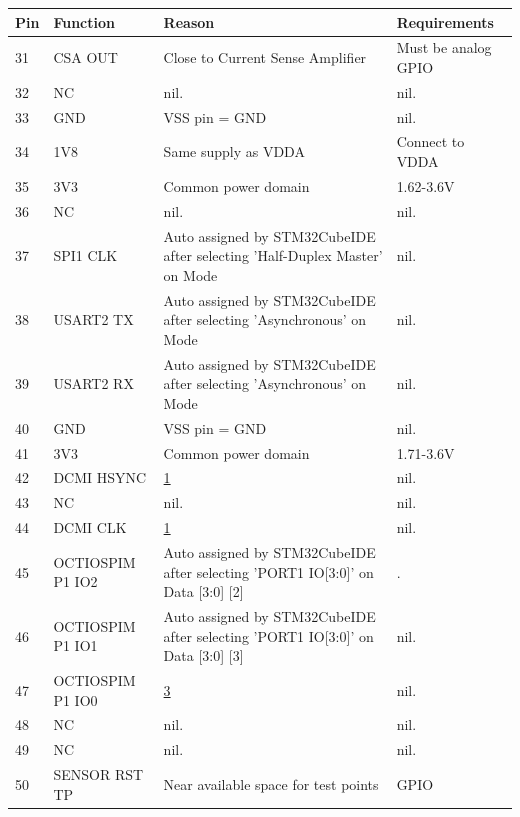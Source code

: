 \begin{table}[H]
    \ContinuedFloat
    \centering
    \begin{tabular}{|l|p{3cm}|p{6.5cm}|p{3.5cm}|}
        \hline
        \textbf{Pin} & \textbf{Function} & \textbf{Reason} & \textbf{Requirements} \\
        \hline
        31 & CSA OUT & Close to Current Sense Amplifier & Must be analog GPIO \\ \hline
        32 & NC & nil. & nil. \\ \hline
        33 & GND & VSS pin = GND & nil. \\ \hline
        34 & 1V8 & Same supply as VDDA & Connect to VDDA \\ \hline
        35 & 3V3 & Common power domain & 1.62-3.6V \\ \hline
        36 & NC & nil. & nil. \\ \hline
        37 & SPI1 CLK & Auto assigned by STM32CubeIDE after selecting 'Half-Duplex Master' on Mode & nil. \\ \hline
        38 & USART2 TX & Auto assigned by STM32CubeIDE after selecting 'Asynchronous' on Mode & nil. \\ \hline
        39 & USART2 RX & Auto assigned by STM32CubeIDE after selecting 'Asynchronous' on Mode & nil. \\ \hline
        40 & GND & VSS pin = GND & nil. \\ \hline
        41 & 3V3 & Common power domain & 1.71-3.6V \\ \hline
        42 & DCMI HSYNC & \hyperlink{dcmi-reason}{1} & nil. \\ \hline
        43 & NC & nil. & nil. \\ \hline
        44 & DCMI CLK & \hyperlink{dcmi-reason}{1} & nil. \\ \hline
        45 & OCTIOSPIM P1 IO2 & Auto assigned by STM32CubeIDE after selecting 'PORT1 IO[3:0]' on Data [3:0] \hypertarget{octo-io-4+}{[2]} & . \\ \hline
        46 & OCTIOSPIM P1 IO1 & Auto assigned by STM32CubeIDE after selecting 'PORT1 IO[3:0]' on Data [3:0] \hypertarget{octo-io-4-}{[3]} & nil. \\ \hline
        47 & OCTIOSPIM P1 IO0 & \hyperlink{octo-io-4-}{3} & nil. \\ \hline
        48 & NC & nil. & nil. \\ \hline
        49 & NC & nil. & nil. \\ \hline
        50 & SENSOR RST TP & Near available space for test points & GPIO \\ \hline

\end{tabular}
\end{table}
